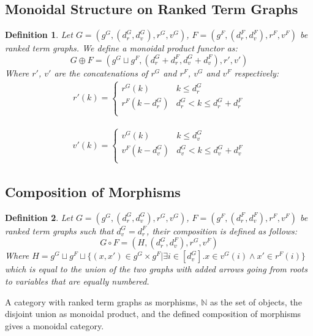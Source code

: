 \documentclass[12pt]{article}
\newtheorem{definition}{Definition}
\newcommand{\1}{\mathbbm{1}}
\begin{document}
\subsection{Monoidal Structure on Ranked Term Graphs}
\begin{definition}
Let $G = (g^G, (d_r^G, d_v^G), r^G, v^G)$, $F = (g^F, (d_r^F, d_v^F), r^F, v^F)$ be ranked term graphs. We define a monoidal product functor as:
$$G \oplus F = \left(g^G \sqcup g^F, (d_r^G + d_r^F, d_v^G + d_v^F), r', v'\right)$$
Where $r'$, $v'$ are the concatenations of $r^G$ and $r^F$, $v^G$ and $v^F$ respectively:
\begin{align*}
    r'(k) = \begin{cases} 
      r^G(k) & k\leq d^G_r\\
      r^F(k-d^G_r)& d^G_r < k \leq d^G_r + d^F_r \\
   \end{cases}
\end{align*}

\begin{align*}
    v'(k) = \begin{cases} 
      v^G(k) & k\leq d^G_v\\
      v^F(k-d^G_v)& d^G_v < k \leq d^G_v + d^F_v \\
   \end{cases}
\end{align*}
\end{definition}

\subsection{Composition of Morphisms}
\begin{definition}
Let $G = (g^G, (d_r^G, d_v^G), r^G, v^G)$, $F = (g^F, (d_r^F, d_v^F), r^F, v^F)$ be ranked term graphs such that $d_v^G = d_r^F$, their composition is defined as follows:
$$G\circ F = (H, (d_r^G, d_v^F), r^G, v^F)$$
Where $H = g^G\sqcup g^F \sqcup\{(x,x') \in g^G\times g^F | \exists i\in[d_v^G]. x\in v^G(i) \wedge x'\in r^F(i)\}$ which is equal to the union of the two graphs with added arrows going from roots to variables that are equally numbered.
\end{definition}

A category with ranked term graphs as morphisms, $\mathbb{N}$ as the set of objects, the disjoint union as monoidal product, and the defined composition of morphisms gives a monoidal category.

\newpage
\end{document}
